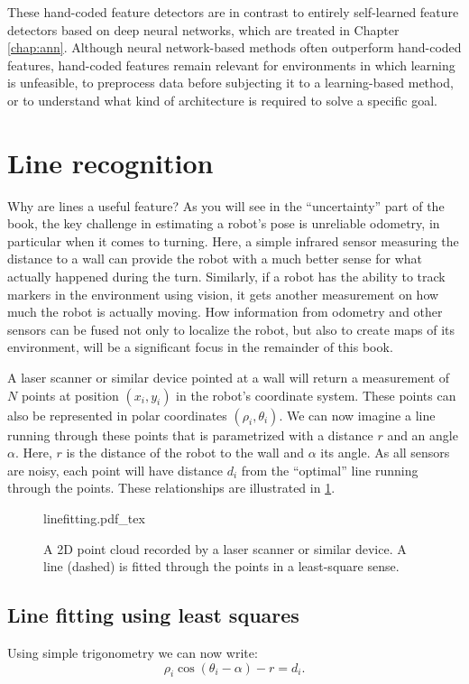 These hand-coded feature detectors are in contrast to entirely self-learned feature detectors based on deep neural networks, which are treated in Chapter \cref{chap:ann}. Although neural network-based methods often outperform hand-coded features, hand-coded features remain relevant for environments in which learning is unfeasible, to preprocess data before subjecting it to a learning-based method, or to understand what kind of architecture is required to solve a specific goal.

\section{Line recognition}
\label{sec:line_recognition}
Why are lines a useful feature? As you will see in the ``uncertainty'' part of the book, the key challenge in estimating a robot's pose is unreliable odometry, in particular when it comes to turning. Here, a simple infrared sensor measuring the distance to a wall can provide the robot with a much better sense for what actually happened during the turn. Similarly, if a robot has the ability to track markers in the environment using vision, it gets another measurement on how much the robot is actually moving. How information from odometry and other sensors can be fused not only to localize the robot, but also to create maps of its environment, will be a significant focus in the remainder of this book.

A laser scanner or similar device pointed at a wall will return a measurement of $N$ points at position $(x_i,y_i)$ in the robot's coordinate system. These points can also be represented in polar coordinates $ (\rho_i,\theta_i)$. We can now imagine a line running through these points that is parametrized with a distance $r$ and an angle $\alpha$. Here, $r$ is the distance of the robot to the wall and $ \alpha$ its angle. As all sensors are noisy, each point will have distance $d_i$ from the ``optimal'' line running through the points. These relationships are illustrated in \cref{fig:linefitting}.

\begin{figure}
	\centering
    \def\svgwidth{\textwidth}
    {linefitting.pdf_tex}
	\caption{A 2D point cloud recorded by a laser scanner or similar device. A line (dashed) is fitted through the points in a least-square sense.}
	\label{fig:linefitting}
\end{figure}

\subsection{Line fitting using least squares}
Using simple trigonometry we can now write:
\begin{equation}
\rho_i \cos(\theta_i-\alpha)-r=d_i.
\end{equation}

